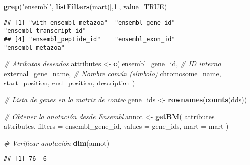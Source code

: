 \documentclass[
]{article}
\newenvironment{Shaded}{\begin{snugshade}}{\end{snugshade}}
\newcommand{\AttributeTok}[1]{\textcolor[rgb]{0.13,0.29,0.53}{#1}}
\newcommand{\CommentTok}[1]{\textcolor[rgb]{0.56,0.35,0.01}{\textit{#1}}}
\newcommand{\ConstantTok}[1]{\textcolor[rgb]{0.56,0.35,0.01}{#1}}
\newcommand{\DecValTok}[1]{\textcolor[rgb]{0.00,0.00,0.81}{#1}}
\newcommand{\FunctionTok}[1]{\textcolor[rgb]{0.13,0.29,0.53}{\textbf{#1}}}
\newcommand{\NormalTok}[1]{#1}
\newcommand{\OtherTok}[1]{\textcolor[rgb]{0.56,0.35,0.01}{#1}}
\newcommand{\StringTok}[1]{\textcolor[rgb]{0.31,0.60,0.02}{#1}}
\begin{document}
\begin{Shaded}
\begin{Highlighting}[]
\FunctionTok{grep}\NormalTok{(}\StringTok{"ensembl"}\NormalTok{, }\FunctionTok{listFilters}\NormalTok{(mart)[,}\DecValTok{1}\NormalTok{], }\AttributeTok{value=}\ConstantTok{TRUE}\NormalTok{)}
\end{Highlighting}
\end{Shaded}

\begin{verbatim}
## [1] "with_ensembl_metazoa"  "ensembl_gene_id"       "ensembl_transcript_id"
## [4] "ensembl_peptide_id"    "ensembl_exon_id"       "ensembl_metazoa"
\end{verbatim}

\begin{Shaded}
\begin{Highlighting}[]
\CommentTok{\# Atributos deseados}
\NormalTok{attributes }\OtherTok{\textless{}{-}} \FunctionTok{c}\NormalTok{(}
  \StringTok{\textquotesingle{}ensembl\_gene\_id\textquotesingle{}}\NormalTok{,          }\CommentTok{\# ID interno}
  \StringTok{\textquotesingle{}external\_gene\_name\textquotesingle{}}\NormalTok{,       }\CommentTok{\# Nombre común (símbolo)}
  \StringTok{\textquotesingle{}chromosome\_name\textquotesingle{}}\NormalTok{,}
  \StringTok{\textquotesingle{}start\_position\textquotesingle{}}\NormalTok{,}
  \StringTok{\textquotesingle{}end\_position\textquotesingle{}}\NormalTok{,}
  \StringTok{\textquotesingle{}description\textquotesingle{}}
\NormalTok{)}

\CommentTok{\# Lista de genes en la matriz de conteo}
\NormalTok{gene\_ids }\OtherTok{\textless{}{-}} \FunctionTok{rownames}\NormalTok{(}\FunctionTok{counts}\NormalTok{(dds))}

\CommentTok{\# Obtener la anotación desde Ensembl}
\NormalTok{annot }\OtherTok{\textless{}{-}} \FunctionTok{getBM}\NormalTok{(}
  \AttributeTok{attributes =}\NormalTok{ attributes,}
  \AttributeTok{filters =} \StringTok{\textquotesingle{}ensembl\_gene\_id\textquotesingle{}}\NormalTok{,}
  \AttributeTok{values =}\NormalTok{ gene\_ids,}
  \AttributeTok{mart =}\NormalTok{ mart}
\NormalTok{)}

\CommentTok{\# Verificar anotación}
\FunctionTok{dim}\NormalTok{(annot)}
\end{Highlighting}
\end{Shaded}

\begin{verbatim}
## [1] 76  6
\end{verbatim}
\end{document}
